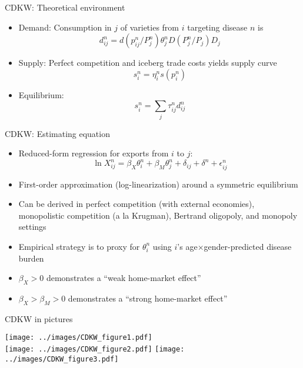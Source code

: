 \documentclass[11pt,notes=hide,aspectratio=169]{beamer}
\begin{document}
\begin{frame}{CDKW: Theoretical environment}
\begin{itemize}
	\item Demand: Consumption in $j$ of varieties from $i$ targeting disease $n$ is
	\begin{equation*}d_{ij}^n = d(p_{ij}^n/P_j^n) \theta_j^n D(P_j^n/P_j) D_j \end{equation*}
	\item Supply: Perfect competition and iceberg trade costs yields supply curve
	\begin{equation*} s_i^n = \eta_i^n s(p_i^n)\end{equation*}
	\item Equilibrium: 
	\begin{equation*} s_i^n = \sum_j \tau_{ij}^n d_{ij}^n \end{equation*}
\end{itemize}
\end{frame}
\begin{frame}{CDKW: Estimating equation}
\begin{itemize}
	\item Reduced-form regression for exports from $i$ to $j$:
	\begin{equation*}
		\ln X_{ij}^n = \beta_X \theta_i^n + \beta_M \theta_j^n +  \delta_{ij} + \delta^n + \epsilon_{ij}^n
	\end{equation*}
 	\item First-order approximation (log-linearization) around a symmetric equilibrium
 	\item Can be derived in perfect competition (with external economies), monopolistic competition (a la Krugman), Bertrand oligopoly, and monopoly settings
 	\item Empirical strategy is to proxy for $\theta_i^n$ using $i$'s age$\times$gender-predicted disease burden
 	\item $\beta_X > 0$ demonstrates a ``weak home-market effect''
 	\item $\beta_X > \beta_M > 0$ demonstrates a ``strong home-market effect''
\end{itemize}
\end{frame}
\begin{frame}{CDKW in pictures}
\begin{center}
\texttt{[image: ../images/CDKW\_figure1.pdf]}\\
\texttt{[image: ../images/CDKW\_figure2.pdf]}
\texttt{[image: ../images/CDKW\_figure3.pdf]}
\end{center}
\end{frame}
\end{document}
